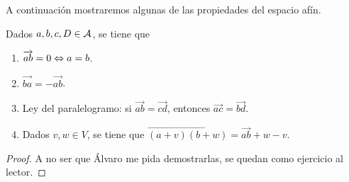 A continuación mostraremos algunas de las propiedades del espacio afín.
\begin{lem}
	Dados $a,b,c,D\in\mathcal{A}$, se tiene que
	\begin{enumerate}
		\item $\overrightarrow{ab}=0\Leftrightarrow a=b$.
		\item $\overrightarrow{ba}=-\overrightarrow{ab}$.
		\item Ley del paralelogramo: si $\overrightarrow{ab}=\overrightarrow{cd}$, entonces $\overrightarrow{ac}=\overrightarrow{bd}$.
		\item Dados $v,w\in V$, se tiene que $\overrightarrow{(a+v)(b+w)}=\overrightarrow{ab}+w-v$.
	\end{enumerate}
\end{lem}
\begin{proof}
	A no ser que Álvaro me pida demostrarlas, se quedan como ejercicio al lector.
\end{proof}

